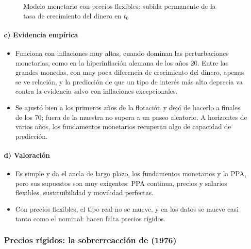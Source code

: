 \documentclass[11pt]{article}
\begin{document}
\begin{figure}[H]
\centering
\caption{Modelo monetario con precios flexibles: subida permanente de la tasa de crecimiento del dinero en $t_0$}\label{fig:monetario-flexible}
\end{figure}

\paragraph{c) Evidencia empírica}
\begin{itemize}
\item Funciona con inflaciones muy altas, cuando dominan las perturbaciones monetarias, como en la hiperinflación alemana de los años 20\nocite{Frenkel1976Monetary}. Entre las grandes monedas, con muy poca diferencia de crecimiento del dinero, apenas se ve relación\nocite{Mussa1984Theory}, y la predicción de que un tipo de interés más alto deprecia va contra la evidencia salvo con inflaciones excepcionales.
\item Se ajustó bien a los primeros años de la flotación y dejó de hacerlo a finales de los 70; fuera de la muestra no supera a un paseo aleatorio\nocite{MeeseRogoff1983}. A horizontes de varios años, los fundamentos monetarios recuperan algo de capacidad de predicción\nocite{Mark1995}.
\end{itemize}

\paragraph{d) Valoración}
\begin{itemize}
\item Es simple y da el ancla de largo plazo, los fundamentos monetarios y la PPA, pero sus supuestos son muy exigentes: PPA continua, precios y salarios flexibles, sustituibilidad y movilidad perfectas.
\item Con precios flexibles, el tipo real no se mueve, y en los datos se mueve casi tanto como el nominal: hacen falta precios rígidos.
\end{itemize}

\subsubsection{Precios rígidos: la sobrerreacción de  (1976)}\label{sec:dornbusch}
\end{document}
